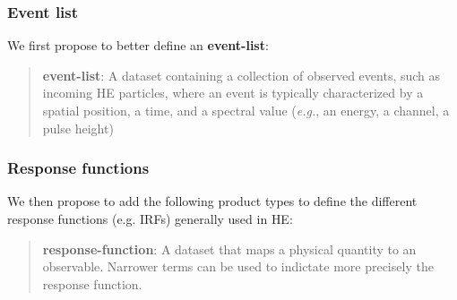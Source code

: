 \documentclass[11pt,a4paper]{ivoa}
\begin{document}


\subsubsection{Event list}

We first propose to better define an {\bf event-list}:

\begin{quote}
{\bf event-list}: A dataset containing a collection of observed events, such as incoming \gls{HE} particles, where an event is typically characterized by a spatial position, a time, and a spectral value ({\em e.g.\/}, an energy, a channel, a pulse height)
\end{quote}

\subsubsection{Response functions}

We then propose to add the following product types to define the different response functions (e.g. \glspl{IRF}) generally used in \gls{HE}:

\begin{quote}
{\bf response-function}: A dataset that maps a physical quantity to an observable. Narrower terms can be used to indictate more precisely the response function.
\end{quote}
\end{document}

